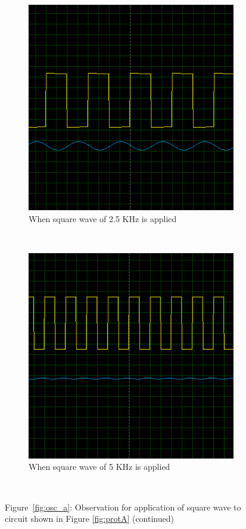 \documentclass{lab_sheet}
\begin{document}
\begin{figure}[H]
   \ContinuedFloat
   \centering
   \begin{subfigure}{0.49\textwidth}
      \centering
   \includegraphics[width=0.9\linewidth]{../Figures/osc_a_4.png}
   \caption{When square wave of 2.5 KHz is applied}
   \end{subfigure}~
   \begin{subfigure}{0.49\textwidth}
      \centering
   \includegraphics[width=0.9\linewidth]{../Figures/osc_a_2.png}
   \caption{When square wave of 5 KHz is applied}
   \end{subfigure}~
      \caption*{Figure~\ref{fig:osc_a}: Observation for application of square wave to circuit shown in Figure \ref{fig:protA} (continued)}
\end{figure}
\end{document}
